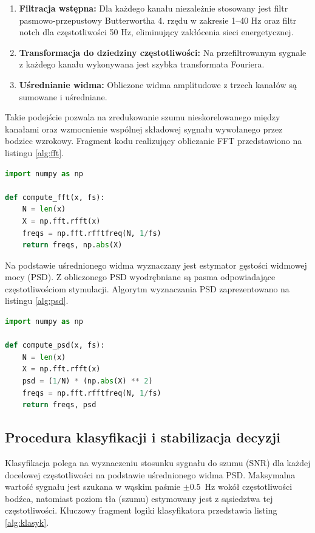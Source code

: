 \begin{enumerate}
    \item \textbf{Filtracja wstępna:} Dla każdego kanału niezależnie stosowany jest filtr pasmowo-przepustowy Butterwortha 4. rzędu w zakresie 1--40 Hz oraz filtr notch dla częstotliwości 50 Hz, eliminujący zakłócenia sieci energetycznej.
    \item \textbf{Transformacja do dziedziny częstotliwości:} Na przefiltrowanym sygnale z każdego kanału wykonywana jest szybka transformata Fouriera.
    \item \textbf{Uśrednianie widma:} Obliczone widma amplitudowe z trzech kanałów są sumowane i uśredniane.
\end{enumerate}

Takie podejście pozwala na zredukowanie szumu nieskorelowanego między kanałami oraz wzmocnienie wspólnej składowej sygnału wywołanego przez bodziec wzrokowy.
Fragment kodu realizujący obliczanie FFT przedstawiono na listingu \ref{alg:fft}.

\begin{lstlisting}[language=Python, caption=Fragment kodu obliczającego FFT, label=alg:fft]
import numpy as np

def compute_fft(x, fs):
    N = len(x)
    X = np.fft.rfft(x)
    freqs = np.fft.rfftfreq(N, 1/fs)
    return freqs, np.abs(X)
\end{lstlisting}

Na podstawie uśrednionego widma wyznaczany jest estymator gęstości widmowej mocy (PSD).
Z obliczonego PSD wyodrębniane są pasma odpowiadające częstotliwościom stymulacji. Algorytm wyznaczania PSD zaprezentowano na listingu \ref{alg:psd}.

\begin{lstlisting}[language=Python, caption=Fragment algorytmu wyznaczania PSD, label=alg:psd]
import numpy as np

def compute_psd(x, fs):
    N = len(x)
    X = np.fft.rfft(x)
    psd = (1/N) * (np.abs(X) ** 2)
    freqs = np.fft.rfftfreq(N, 1/fs)
    return freqs, psd
\end{lstlisting}

\subsection*{Procedura klasyfikacji i stabilizacja decyzji}

Klasyfikacja polega na wyznaczeniu stosunku sygnału do szumu (SNR) dla każdej docelowej częstotliwości na podstawie uśrednionego widma PSD.
Maksymalna wartość sygnału jest szukana w wąskim paśmie $\pm 0.5$~Hz wokół częstotliwości bodźca, natomiast poziom tła (szumu) estymowany jest z sąsiedztwa tej częstotliwości.
Kluczowy fragment logiki klasyfikatora przedstawia listing \ref{alg:klasyk}.

